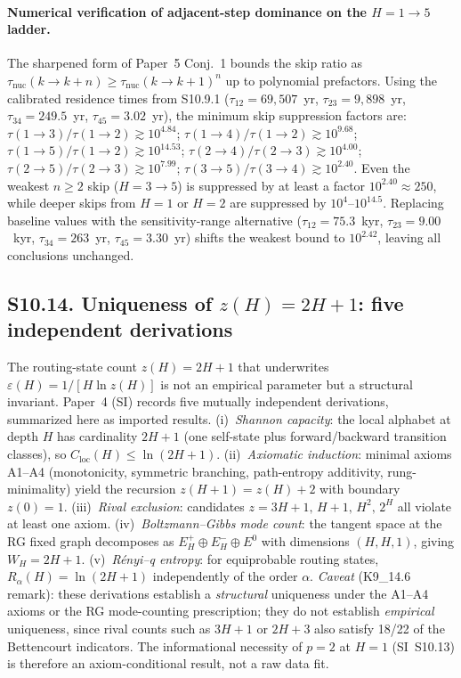 \documentclass[11pt]{article}
\begin{document}
\paragraph{Numerical verification of adjacent-step dominance on the $H{=}1\to 5$ ladder.}
The sharpened form of Paper~5 Conj.~1 bounds the skip ratio as $\tau_{\mathrm{nuc}}(k\to k{+}n)\ge\tau_{\mathrm{nuc}}(k\to k{+}1)^{n}$ up to polynomial prefactors.  Using the calibrated residence times from S10.9.1 ($\tau_{12}=69{,}507$~yr, $\tau_{23}=9{,}898$~yr, $\tau_{34}=249.5$~yr, $\tau_{45}=3.02$~yr), the minimum skip suppression factors are: $\tau(1\to3)/\tau(1\to2)\gtrsim 10^{4.84}$; $\tau(1\to4)/\tau(1\to2)\gtrsim 10^{9.68}$; $\tau(1\to5)/\tau(1\to2)\gtrsim 10^{14.53}$; $\tau(2\to4)/\tau(2\to3)\gtrsim 10^{4.00}$; $\tau(2\to5)/\tau(2\to3)\gtrsim 10^{7.99}$; $\tau(3\to5)/\tau(3\to4)\gtrsim 10^{2.40}$.  Even the weakest $n{\ge}2$ skip ($H{=}3\to 5$) is suppressed by at least a factor $10^{2.40}\approx 250$, while deeper skips from $H{=}1$ or $H{=}2$ are suppressed by $10^{4}$--$10^{14.5}$.  Replacing baseline values with the sensitivity-range alternative ($\tau_{12}=75.3$~kyr, $\tau_{23}=9.00$~kyr, $\tau_{34}=263$~yr, $\tau_{45}=3.30$~yr) shifts the weakest bound to $10^{2.42}$, leaving all conclusions unchanged.

\subsection*{S10.14. Uniqueness of $z(H)=2H{+}1$: five independent derivations}
\label{subsec:S10_14_zH_uniqueness}
The routing-state count $z(H)=2H{+}1$ that underwrites $\varepsilon(H)=1/[H\ln z(H)]$
is not an empirical parameter but a structural invariant.  Paper~4 (SI) records
five mutually independent derivations, summarized here as imported results.
(i)~\emph{Shannon capacity}: the local alphabet at depth $H$ has cardinality $2H{+}1$
(one self-state plus forward/backward transition classes), so $C_{\mathrm{loc}}(H)\le\ln(2H{+}1)$.
(ii)~\emph{Axiomatic induction}: minimal axioms A1--A4 (monotonicity, symmetric branching,
path-entropy additivity, rung-minimality) yield the recursion $z(H{+}1)=z(H)+2$ with
boundary $z(0)=1$.
(iii)~\emph{Rival exclusion}: candidates $z=3H{+}1,\,H{+}1,\,H^2,\,2^H$ all violate at least
one axiom.
(iv)~\emph{Boltzmann--Gibbs mode count}: the tangent space at the RG fixed graph
decomposes as $E^+_H\oplus E^-_H\oplus E^0$ with dimensions $(H,H,1)$, giving
$W_H=2H{+}1$.
(v)~\emph{R\'enyi--q entropy}: for equiprobable routing states, $R_\alpha(H)=\ln(2H{+}1)$
independently of the order $\alpha$.
\emph{Caveat} (K9\_14.6 remark): these derivations establish a \emph{structural} uniqueness
under the A1--A4 axioms or the RG mode-counting prescription; they do not establish
\emph{empirical} uniqueness, since rival counts such as $3H{+}1$ or $2H{+}3$ also satisfy
18/22 of the Bettencourt indicators.  The informational necessity of $p{=}2$ at $H{=}1$
(SI~S10.13) is therefore an axiom-conditional result, not a raw data fit.
\end{document}
